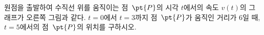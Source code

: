 \noindent\begin{minipage}[t]{0.58\linewidth}\vspace{0pt}\raggedright 원점을 출발하여 수직선 위를 움직이는 점~$\pt{P}$의 시각 $t$에서의 속도 $v(t)$의 그래프가 오른쪽 그림과 같다. $t=0$에서 $t=3$까지 점~$\pt{P}$가 움직인 거리가 $6$일 때, $t=5$에서의 점~$\pt{P}$의 위치를 구하시오.\end{minipage}\hfill\begin{minipage}[t]{0.4\linewidth}\vspace{0pt}\centering \resizebox{\ifdim\width>\linewidth\linewidth\else\width\fi}{!}{}\end{minipage}\par
